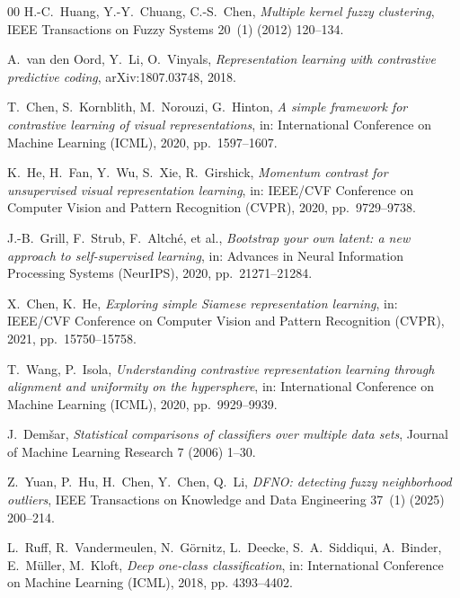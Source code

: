 \documentclass[times, review, 10pt]{elsarticle}
\begin{document}
\begin{thebibliography}{00}
H.-C.~Huang, Y.-Y.~Chuang, C.-S.~Chen,
\textit{Multiple kernel fuzzy clustering},
IEEE Transactions on Fuzzy Systems 20~(1) (2012) 120--134.

A.~van den Oord, Y.~Li, O.~Vinyals,
\textit{Representation learning with contrastive predictive coding},
arXiv:1807.03748, 2018.

T.~Chen, S.~Kornblith, M.~Norouzi, G.~Hinton,
\textit{A simple framework for contrastive learning of visual
representations},
in: International Conference on Machine Learning (ICML), 2020, pp.\ 1597--1607.

K.~He, H.~Fan, Y.~Wu, S.~Xie, R.~Girshick,
\textit{Momentum contrast for unsupervised visual representation learning},
in: IEEE/CVF Conference on Computer Vision and Pattern Recognition (CVPR),
2020, pp.\ 9729--9738.

J.-B.~Grill, F.~Strub, F.~Altch\'e, et al.,
\textit{Bootstrap your own latent: a new approach to self-supervised
learning},
in: Advances in Neural Information Processing Systems (NeurIPS), 2020,
pp.\ 21271--21284.

X.~Chen, K.~He,
\textit{Exploring simple Siamese representation learning},
in: IEEE/CVF Conference on Computer Vision and Pattern Recognition (CVPR),
2021, pp.\ 15750--15758.

T.~Wang, P.~Isola,
\textit{Understanding contrastive representation learning through alignment
and uniformity on the hypersphere},
in: International Conference on Machine Learning (ICML), 2020, pp.\ 9929--9939.

J.~Dem\v{s}ar,
\textit{Statistical comparisons of classifiers over multiple data sets},
Journal of Machine Learning Research 7 (2006) 1--30.

Z.~Yuan, P.~Hu, H.~Chen, Y.~Chen, Q.~Li,
\textit{DFNO: detecting fuzzy neighborhood outliers},
IEEE Transactions on Knowledge and Data Engineering 37~(1) (2025) 200--214.

L.~Ruff, R.~Vandermeulen, N.~G\"ornitz, L.~Deecke, S.~A.~Siddiqui, A.~Binder,
E.~M\"uller, M.~Kloft,
\textit{Deep one-class classification},
in: International Conference on Machine Learning (ICML), 2018, pp. 4393--4402.


\end{thebibliography}
\end{document}
